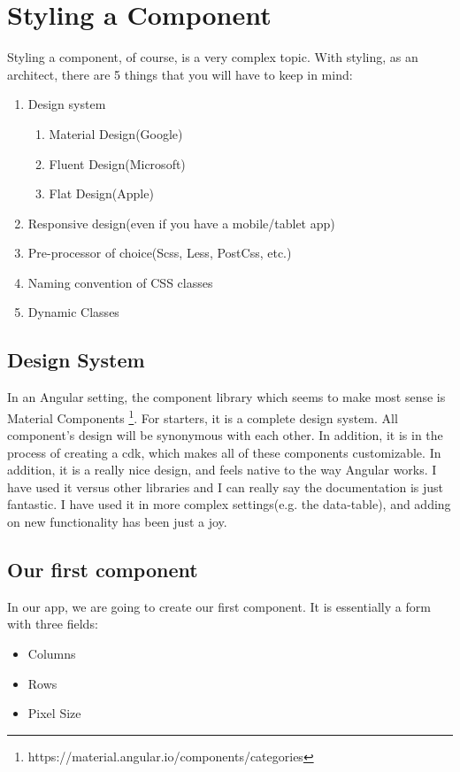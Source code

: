\maketitle{}
\section{ Styling a Component }

Styling a component, of course, is a very complex topic. With styling, as an
architect, there are 5 things that you will have to keep in mind:
\begin{enumerate}
  \item Design system
    \begin{enumerate}
      \item Material Design(Google)
      \item Fluent Design(Microsoft)
      \item Flat Design(Apple)
    \end{enumerate}
  \item Responsive design(even if you have a mobile/tablet app)
  \item Pre-processor of choice(Scss, Less, PostCss, etc.)
  \item Naming convention of CSS classes
  \item Dynamic Classes
\end{enumerate}

\subsection{ Design System }
In an Angular setting, the component library which seems to make most sense is
Material Components
\footnote{https://material.angular.io/components/categories}. For starters, it
is a complete design system. All component's design will be synonymous with
each other. In addition, it is in the process of creating a cdk, which makes
all of these components customizable. In addition, it is a really nice design,
and feels native to the way Angular works. I have used it versus other libraries
and I can really say the documentation is just fantastic. I have used it in more
complex settings(e.g. the data-table), and adding on new functionality has been
just a joy.

\subsection{ Our first component }
In our app, we are going to create our first component. It is essentially a form
with three fields:
\begin{itemize}
  \item Columns
  \item Rows
  \item Pixel Size
\end{itemize}

